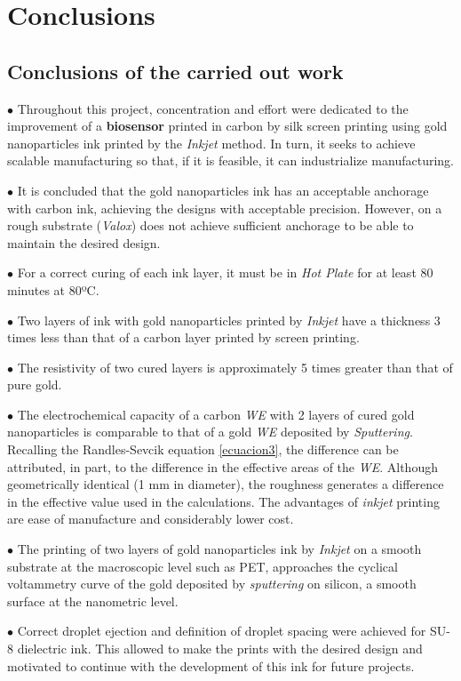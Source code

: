 \chapter{Conclusions}

\section{Conclusions of the carried out work}
$\bullet$ Throughout this project, concentration and effort were dedicated to the improvement of a \textbf{biosensor} printed in carbon by silk screen printing using gold nanoparticles ink printed by the \textit{Inkjet} method. In turn, it seeks to achieve scalable manufacturing so that, if it is feasible, it can industrialize manufacturing.

$\bullet$ It is concluded that the gold nanoparticles ink has an acceptable anchorage with carbon ink, achieving the designs with acceptable precision. However, on a rough substrate (\textit{Valox}) does not achieve sufficient anchorage to be able to maintain the desired design.

$\bullet$ For a correct curing of each ink layer, it must be in \textit{Hot Plate} for at least 80 minutes at 80ºC.

$\bullet$ Two layers of ink with gold nanoparticles printed by \textit{Inkjet} have a thickness 3 times less than that of a carbon layer printed by screen printing.

$\bullet$ The resistivity of two cured layers is approximately 5 times greater than that of pure gold.

$\bullet$ The electrochemical capacity of a carbon \emph{WE} with 2 layers of cured gold nanoparticles is comparable to that of a gold \emph{WE} deposited by \textit{Sputtering}. Recalling the Randles-Sevcik equation \ref{ecuacion3}, the difference can be attributed, in part, to the difference in the effective areas of the \emph{WE}. Although geometrically identical (1 mm in diameter), the roughness generates a difference in the effective value used in the calculations. The advantages of \textit{inkjet} printing are ease of manufacture and considerably lower cost.

$\bullet$ The printing of two layers of gold nanoparticles ink by \textit{Inkjet} on a smooth substrate at the macroscopic level such as PET, approaches the cyclical voltammetry curve of the gold deposited by \textit{sputtering} on silicon, a smooth surface at the nanometric level.

$\bullet$ Correct droplet ejection and definition of droplet spacing were achieved for SU-8 dielectric ink. This allowed to make the prints with the desired design and motivated to continue with the development of this ink for future projects.


